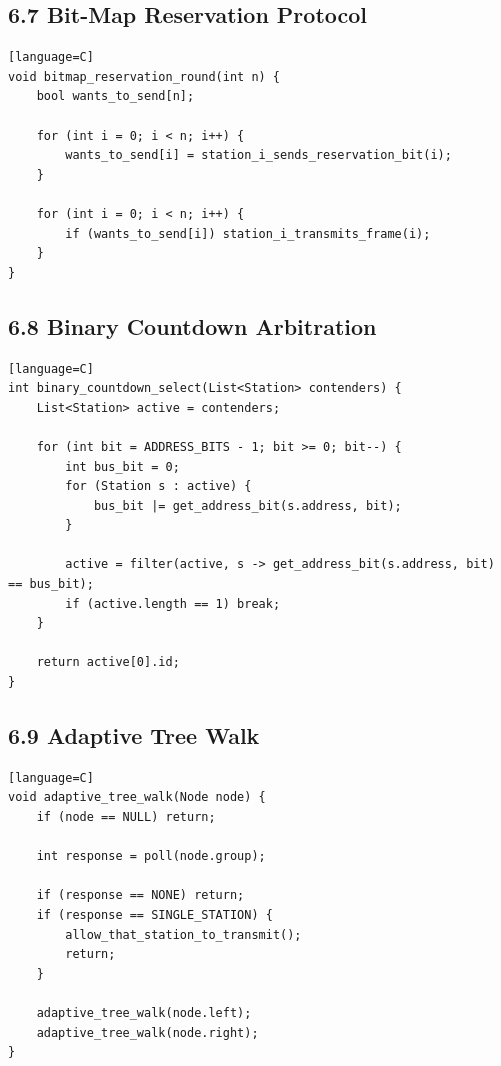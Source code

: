 \documentclass[11pt]{article}
\begin{document}
\subsection{6.7 Bit-Map Reservation
Protocol}\label{bit-map-reservation-protocol}

\begin{verbatim}[language=C]
void bitmap_reservation_round(int n) {
    bool wants_to_send[n];

    for (int i = 0; i < n; i++) {
        wants_to_send[i] = station_i_sends_reservation_bit(i);
    }

    for (int i = 0; i < n; i++) {
        if (wants_to_send[i]) station_i_transmits_frame(i);
    }
}
\end{verbatim}

\subsection{6.8 Binary Countdown
Arbitration}\label{binary-countdown-arbitration}

\begin{verbatim}[language=C]
int binary_countdown_select(List<Station> contenders) {
    List<Station> active = contenders;

    for (int bit = ADDRESS_BITS - 1; bit >= 0; bit--) {
        int bus_bit = 0;
        for (Station s : active) {
            bus_bit |= get_address_bit(s.address, bit);
        }

        active = filter(active, s -> get_address_bit(s.address, bit) == bus_bit);
        if (active.length == 1) break;
    }

    return active[0].id;
}
\end{verbatim}

\subsection{6.9 Adaptive Tree Walk}\label{adaptive-tree-walk}

\begin{verbatim}[language=C]
void adaptive_tree_walk(Node node) {
    if (node == NULL) return;

    int response = poll(node.group);

    if (response == NONE) return;
    if (response == SINGLE_STATION) {
        allow_that_station_to_transmit();
        return;
    }

    adaptive_tree_walk(node.left);
    adaptive_tree_walk(node.right);
}
\end{verbatim}
\end{document}
